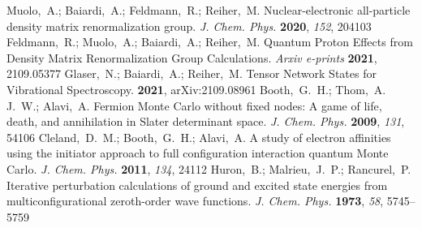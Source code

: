 \documentclass[journal=jctcce]{achemso}
\begin{document}
\begin{mcitethebibliography}{79}
\mciteBstWouldAddEndPuncttrue
\mciteSetBstMidEndSepPunct{\mcitedefaultmidpunct}
{\mcitedefaultendpunct}{\mcitedefaultseppunct}\relax
\EndOfBibitem
{}
Muolo,~A.; Baiardi,~A.; Feldmann,~R.; Reiher,~M. {Nuclear-electronic
  all-particle density matrix renormalization group}. \emph{J. Chem. Phys.}
  \textbf{2020}, \emph{152}, 204103\relax
\mciteBstWouldAddEndPuncttrue
\mciteSetBstMidEndSepPunct{\mcitedefaultmidpunct}
{\mcitedefaultendpunct}{\mcitedefaultseppunct}\relax
\EndOfBibitem
{}
Feldmann,~R.; Muolo,~A.; Baiardi,~A.; Reiher,~M. {Quantum Proton Effects from
  Density Matrix Renormalization Group Calculations}. \emph{Arxiv e-prints}
  \textbf{2021}, 2109.05377\relax
\mciteBstWouldAddEndPuncttrue
\mciteSetBstMidEndSepPunct{\mcitedefaultmidpunct}
{\mcitedefaultendpunct}{\mcitedefaultseppunct}\relax
\EndOfBibitem
{}
Glaser,~N.; Baiardi,~A.; Reiher,~M. {Tensor Network States for Vibrational Spectroscopy}. \textbf{2021}, arXiv:2109.08961 \relax
\mciteBstWouldAddEndPunctfalse
\mciteSetBstMidEndSepPunct{\mcitedefaultmidpunct}
{}{\mcitedefaultseppunct}\relax
\EndOfBibitem
{}
Booth,~G.~H.; Thom,~A. J.~W.; Alavi,~A. {Fermion Monte Carlo without fixed
  nodes: A game of life, death, and annihilation in Slater determinant space}.
  \emph{J. Chem. Phys.} \textbf{2009}, \emph{131}, 54106\relax
\mciteBstWouldAddEndPuncttrue
\mciteSetBstMidEndSepPunct{\mcitedefaultmidpunct}
{\mcitedefaultendpunct}{\mcitedefaultseppunct}\relax
\EndOfBibitem
{}
Cleland,~D.~M.; Booth,~G.~H.; Alavi,~A. {A study of electron affinities using
  the initiator approach to full configuration interaction quantum Monte
  Carlo}. \emph{J. Chem. Phys.} \textbf{2011}, \emph{134}, 24112\relax
\mciteBstWouldAddEndPuncttrue
\mciteSetBstMidEndSepPunct{\mcitedefaultmidpunct}
{\mcitedefaultendpunct}{\mcitedefaultseppunct}\relax
\EndOfBibitem
{}
Huron,~B.; Malrieu,~J.~P.; Rancurel,~P. {Iterative perturbation calculations of
  ground and excited state energies from multiconfigurational zeroth-order wave
  functions}. \emph{J. Chem. Phys.} \textbf{1973}, \emph{58}, 5745--5759\relax

\end{mcitethebibliography}
\end{document}
